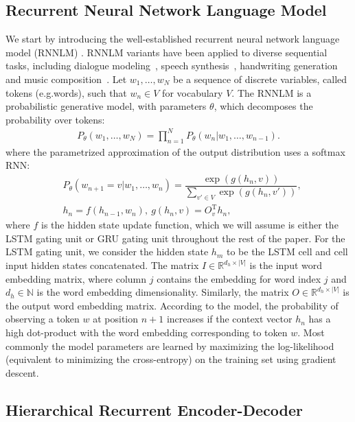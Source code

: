 \documentclass{article}
\begin{document}
\subsection{Recurrent Neural Network Language Model}
We start by introducing the well-established recurrent neural network language model (RNNLM) \cite{mikolov2010recurrent,bengio2003neural}. 
RNNLM variants have been applied to diverse sequential tasks, including dialogue modeling~\cite{DBLP:conf/aaai/SerbanSBCP16}, speech synthesis~\cite{chung2015recurrent}, handwriting generation~\cite{graves2013generating} and music composition~\cite{boulanger2012modeling}. Let $w_1, \dots, w_N$ be a sequence of discrete variables, called tokens (e.g.\@ words), such that $w_n \in V$ for vocabulary $V$.
The RNNLM is a probabilistic generative model,
with parameters $\theta$,
which decomposes the probability over tokens:
\begin{align}
P_{\theta}(w_1, \dots, w_N) = \prod_{n=1}^N P_{\theta}(w_n | w_1, \dots, w_{n-1}).
\end{align}
where the parametrized approximation of the output distribution uses a softmax RNN:
\begin{align}
& P_{\theta}(w_{n+1} = v | w_1, \dots, w_n) = \dfrac{\exp(g(h_n, v))}{\sum_{v' \in V} \exp(g(h_n, v'))}, \\
& h_n = f(h_{n-1}, w_n), \ g(h_n, v) = O_{v}^{\text{T}} h_n,
\end{align}
where $f$ is the hidden state update function, which we will assume is either the LSTM gating unit \cite{hochreiter1997long} or GRU gating unit \cite{cho2014learning} throughout the rest of the paper. For the LSTM gating unit, we consider the hidden state $h_m$ to be the LSTM cell and cell input hidden states concatenated.
The matrix $I \in \mathbb{R}^{d_h \times |V|}$ is the input word embedding matrix, where column $j$ contains the embedding for word index $j$ and $d_h \in \mathbb{N}$ is the word embedding dimensionality. 
Similarly, the matrix $O \in \mathbb{R}^{d_h \times |V|}$ is the output word embedding matrix.
According to the model, the probability of observing a token $w$ at position $n+1$ increases if the context vector $h_n$ has a high dot-product with the word embedding corresponding to token $w$.
Most commonly the model parameters are learned by maximizing the log-likelihood (equivalent to minimizing the cross-entropy) on the training set using gradient descent. 

\subsection{Hierarchical Recurrent Encoder-Decoder}
\label{subseq:hred}
\end{document}
